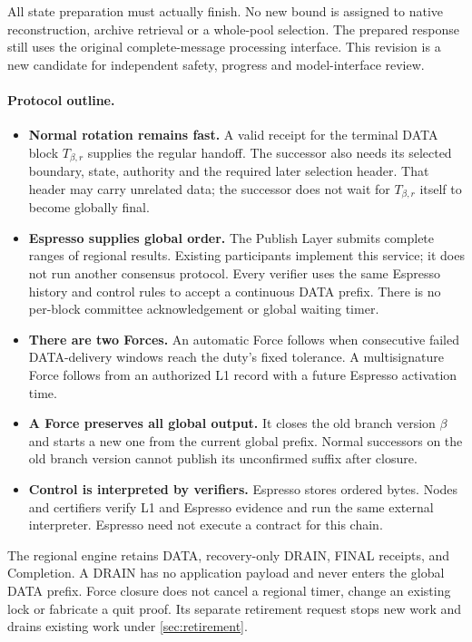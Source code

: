 \documentclass[11pt,a4paper]{article}
\newcounter{protocol}
\begin{document}
All state preparation must actually finish. No new bound is assigned
to native reconstruction, archive retrieval or a whole-pool selection.
The prepared response still uses the original complete-message
processing interface. This revision is a new candidate for independent
safety, progress and model-interface review.

\paragraph{Protocol outline.}
\begin{itemize}
\item \textbf{Normal rotation remains fast.} A valid receipt for the
terminal DATA block $T_{\beta,r}$ supplies the regular handoff. The
successor also needs its selected boundary, state, authority and the
required later selection header. That header may carry unrelated data;
the successor does not wait for $T_{\beta,r}$ itself to become globally final.
\item \textbf{Espresso supplies global order.} The Publish Layer submits
complete ranges of regional results. Existing participants implement this
service; it does not run another consensus protocol. Every verifier uses the same
Espresso history and control rules to accept a continuous DATA prefix.
There is no per-block committee acknowledgement or global waiting timer.
\item \textbf{There are two Forces.} An automatic Force follows when
consecutive failed DATA-delivery windows reach the duty's fixed tolerance. A multisignature Force follows from an
authorized L1 record with a future Espresso activation time.
\item \textbf{A Force preserves all global output.} It closes the old
branch version $\beta$ and starts a new one from the current
global prefix. Normal successors on the old branch version cannot publish its
unconfirmed suffix after closure.
\item \textbf{Control is interpreted by verifiers.} Espresso stores
ordered bytes. Nodes and certifiers verify L1 and Espresso evidence and
run the same external interpreter. Espresso need not execute a contract
for this chain.
\end{itemize}

The regional engine retains DATA, recovery-only DRAIN, FINAL receipts,
and Completion. A DRAIN has no application payload and never enters the
global DATA prefix. Force closure does not cancel a regional timer,
change an existing lock or fabricate a quit proof. Its separate retirement
request stops new work and drains existing work under \cref{sec:retirement}.
\end{document}
